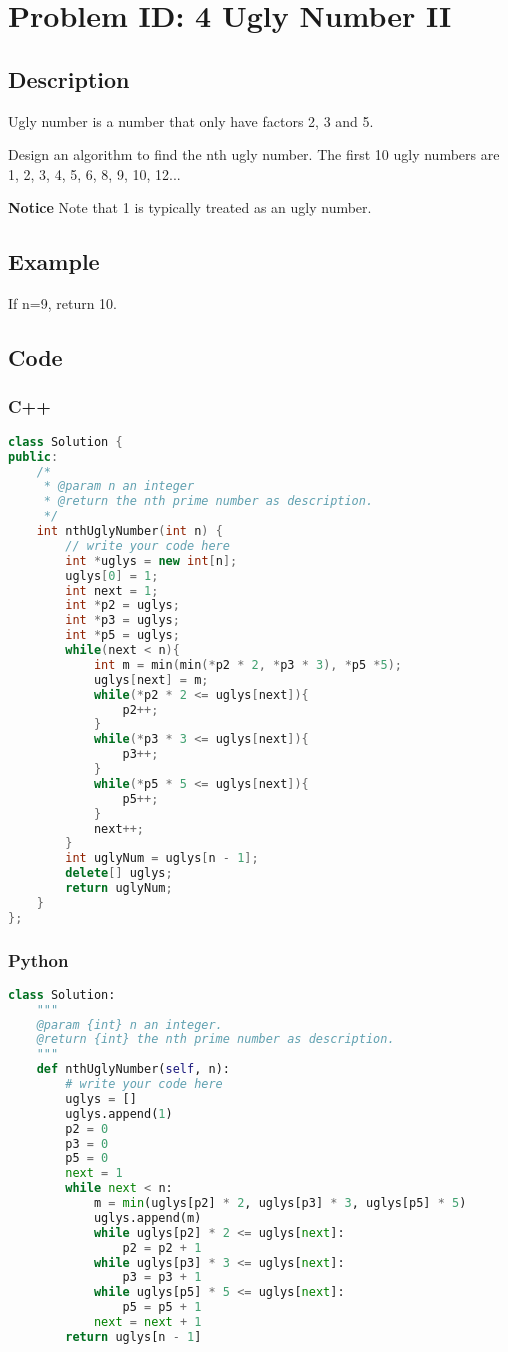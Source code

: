 \section{Problem ID: 4 Ugly Number II}
\subsection{Description}
Ugly number is a number that only have factors 2, 3 and 5.

Design an algorithm to find the nth ugly number. The first 10 ugly numbers are 1, 2, 3, 4, 5, 6, 8, 9, 10, 12...

\textbf{Notice}
Note that 1 is typically treated as an ugly number.

\subsection{Example}
If n=9, return 10.

\subsection{Code}
\scriptsize
\subsubsection{C++}
\begin{lstlisting}[language=C++]
class Solution {
public:
    /*
     * @param n an integer
     * @return the nth prime number as description.
     */
    int nthUglyNumber(int n) {
        // write your code here
        int *uglys = new int[n];
        uglys[0] = 1;
        int next = 1;
        int *p2 = uglys;
        int *p3 = uglys;
        int *p5 = uglys;
        while(next < n){
            int m = min(min(*p2 * 2, *p3 * 3), *p5 *5);
            uglys[next] = m;
            while(*p2 * 2 <= uglys[next]){
                p2++;
            }
            while(*p3 * 3 <= uglys[next]){
                p3++;
            }
            while(*p5 * 5 <= uglys[next]){
                p5++;
            }
            next++;
        }
        int uglyNum = uglys[n - 1];
        delete[] uglys;
        return uglyNum;
    }
};
\end{lstlisting}

\subsubsection{Python}
\begin{lstlisting}[language=Python]
class Solution:
    """
    @param {int} n an integer.
    @return {int} the nth prime number as description.
    """
    def nthUglyNumber(self, n):
        # write your code here
        uglys = []
        uglys.append(1)
        p2 = 0
        p3 = 0
        p5 = 0
        next = 1
        while next < n:
            m = min(uglys[p2] * 2, uglys[p3] * 3, uglys[p5] * 5)
            uglys.append(m)
            while uglys[p2] * 2 <= uglys[next]:
                p2 = p2 + 1
            while uglys[p3] * 3 <= uglys[next]:
                p3 = p3 + 1
            while uglys[p5] * 5 <= uglys[next]:
                p5 = p5 + 1
            next = next + 1
        return uglys[n - 1]
\end{lstlisting}
\normalsize 